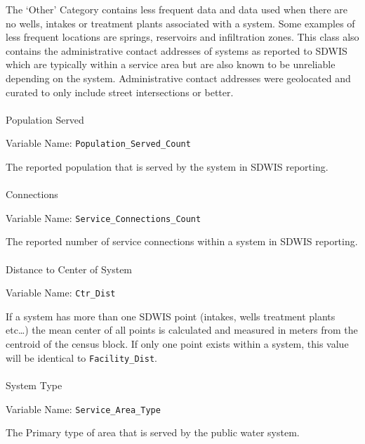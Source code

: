 \documentclass[12pt]{article}
\makeatletter
\let\oldparagraph\paragraph
\renewcommand{\paragraph}{
    \@ifstar
      \xxxParagraphStar
      \xxxParagraphNoStar
  }
\newcommand{\xxxParagraphStar}[1]{\oldparagraph*{#1}\mbox{}}
\newcommand{\xxxParagraphNoStar}[1]{\oldparagraph{#1}\mbox{}}
\makeatother
\begin{document}
The `Other' Category contains less frequent data and data used when
there are no wells, intakes or treatment plants associated with a
system. Some examples of less frequent locations are springs, reservoirs
and infiltration zones. This class also contains the administrative
contact addresses of systems as reported to SDWIS which are typically
within a service area but are also known to be unreliable depending on
the system. Administrative contact addresses were geolocated and curated
to only include street intersections or better.

\paragraph{Population Served}\label{population-served}

Variable Name: \texttt{Population\_Served\_Count}

The reported population that is served by the system in SDWIS reporting.

\paragraph{Connections}\label{connections}

Variable Name: \texttt{Service\_Connections\_Count}

The reported number of service connections within a system in SDWIS
reporting.

\paragraph{Distance to Center of
System}\label{distance-to-center-of-system}

Variable Name: \texttt{Ctr\_Dist}

If a system has more than one SDWIS point (intakes, wells treatment
plants etc\ldots) the mean center of all points is calculated and
measured in meters from the centroid of the census block. If only one
point exists within a system, this value will be identical to
\texttt{Facility\_Dist}.

\paragraph{System Type}\label{system-type}

Variable Name: \texttt{Service\_Area\_Type}

The Primary type of area that is served by the public water system.
\end{document}
